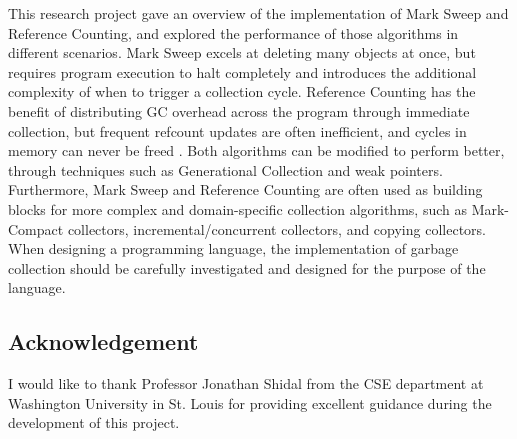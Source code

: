 \documentclass[10pt]{extarticle}
\begin{document}
This research project gave an overview of the implementation of Mark Sweep and Reference Counting, and explored the performance of those algorithms in different scenarios. Mark Sweep excels at deleting many objects at once, but requires program execution to halt completely and introduces the additional complexity of when to trigger a collection cycle. Reference Counting has the benefit of distributing GC overhead across the program through immediate collection, but frequent refcount updates are often inefficient, and cycles in memory can never be freed  . Both algorithms can be modified to perform better, through techniques such as Generational Collection and weak pointers. Furthermore, Mark Sweep and Reference Counting are often used as building blocks for more complex and domain-specific collection algorithms, such as Mark-Compact collectors, incremental/concurrent collectors, and copying collectors. When designing a programming language, the implementation of garbage collection should be carefully investigated and designed for the purpose of the language.

\subsection{Acknowledgement}

I would like to thank Professor Jonathan Shidal from the CSE department at Washington University in St. Louis for providing excellent guidance during the development of this project.
\end{document}
